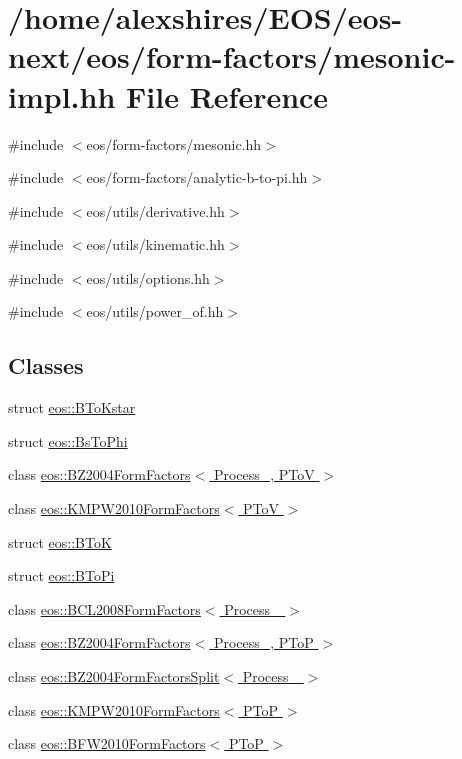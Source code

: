 \hypertarget{mesonic-impl_8hh}{
\section{/home/alexshires/EOS/eos-\/next/eos/form-\/factors/mesonic-\/impl.hh File Reference}
\label{mesonic-impl_8hh}
}
{\ttfamily \#include $<$eos/form-\/factors/mesonic.hh$>$}\par
{\ttfamily \#include $<$eos/form-\/factors/analytic-\/b-\/to-\/pi.hh$>$}\par
{\ttfamily \#include $<$eos/utils/derivative.hh$>$}\par
{\ttfamily \#include $<$eos/utils/kinematic.hh$>$}\par
{\ttfamily \#include $<$eos/utils/options.hh$>$}\par
{\ttfamily \#include $<$eos/utils/power\_\-of.hh$>$}\par
\subsection*{Classes}
\begin{DoxyCompactItemize}
\item 
struct \hyperlink{structeos_1_1BToKstar}{eos::BToKstar}
\item 
struct \hyperlink{structeos_1_1BsToPhi}{eos::BsToPhi}
\item 
class \hyperlink{classeos_1_1BZ2004FormFactors_3_01Process___00_01PToV_01_4}{eos::BZ2004FormFactors$<$ Process\_\-, PToV $>$}
\item 
class \hyperlink{classeos_1_1KMPW2010FormFactors_3_01PToV_01_4}{eos::KMPW2010FormFactors$<$ PToV $>$}
\item 
struct \hyperlink{structeos_1_1BToK}{eos::BToK}
\item 
struct \hyperlink{structeos_1_1BToPi}{eos::BToPi}
\item 
class \hyperlink{classeos_1_1BCL2008FormFactors}{eos::BCL2008FormFactors$<$ Process\_\- $>$}
\item 
class \hyperlink{classeos_1_1BZ2004FormFactors_3_01Process___00_01PToP_01_4}{eos::BZ2004FormFactors$<$ Process\_\-, PToP $>$}
\item 
class \hyperlink{classeos_1_1BZ2004FormFactorsSplit}{eos::BZ2004FormFactorsSplit$<$ Process\_\- $>$}
\item 
class \hyperlink{classeos_1_1KMPW2010FormFactors_3_01PToP_01_4}{eos::KMPW2010FormFactors$<$ PToP $>$}
\item 
class \hyperlink{classeos_1_1BFW2010FormFactors_3_01PToP_01_4}{eos::BFW2010FormFactors$<$ PToP $>$}
\end{DoxyCompactItemize}
